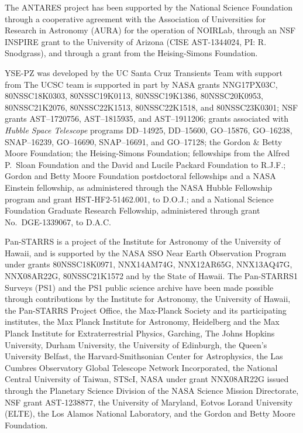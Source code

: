 \documentclass[twocolumn]{aastex63}
\begin{document}
The ANTARES project has been supported by the National Science Foundation through a cooperative agreement with the Association of Universities for Research in Astronomy (AURA) for the operation of NOIRLab, through an NSF INSPIRE grant to the University of Arizona (CISE AST-1344024, PI: R. Snodgrass), and through a grant from the Heising-Simons Foundation. \par

YSE-PZ was developed by the UC Santa Cruz Transients Team with support from The UCSC team is supported in part by NASA grants 
NNG17PX03C, 80NSSC18K0303, 80NSSC19K0113, 80NSSC19K1386, 80NSSC20K0953, 80NSSC21K2076, 80NSSC22K1513, 80NSSC22K1518, and 80NSSC23K0301; NSF grants AST--1720756, AST--1815935, and AST--1911206; grants associated with {\it Hubble Space Telescope} programs DD--14925, DD--15600, GO--15876, GO--16238, SNAP--16239, GO--16690, SNAP--16691, and GO--17128; the Gordon \& Betty Moore Foundation; the Heising-Simons Foundation; fellowships from the Alfred P.\ Sloan Foundation and the David and Lucile Packard Foundation to R.J.F.; Gordon and Betty Moore Foundation postdoctoral fellowships and a NASA Einstein fellowship, as administered through the NASA Hubble Fellowship program and grant HST-HF2-51462.001, to D.O.J.; and a National Science Foundation Graduate Research Fellowship, administered through grant No.\ DGE-1339067, to D.A.C.

Pan-STARRS is a project of the Institute for Astronomy of the University of Hawaii, and is supported by the NASA SSO Near Earth Observation Program under grants 80NSSC18K0971, NNX14AM74G, NNX12AR65G, NNX13AQ47G, NNX08AR22G, 80NSSC21K1572 and by the State of Hawaii.  The Pan-STARRS1 Surveys (PS1) and the PS1 public science archive have been made possible through contributions by the Institute for Astronomy, the University of Hawaii, the Pan-STARRS Project Office, the Max-Planck Society and its participating institutes, the Max Planck Institute for Astronomy, Heidelberg and the Max Planck Institute for Extraterrestrial Physics, Garching, The Johns Hopkins University, Durham University, the University of Edinburgh, the Queen's University Belfast, the Harvard-Smithsonian Center for Astrophysics, the Las Cumbres Observatory Global Telescope Network Incorporated, the National Central University of Taiwan, STScI, NASA under grant NNX08AR22G issued through the Planetary Science Division of the NASA Science Mission Directorate, NSF grant AST-1238877, the University of Maryland, Eotvos Lorand University (ELTE), the Los Alamos National Laboratory, and the Gordon and Betty Moore Foundation.
\end{document}
